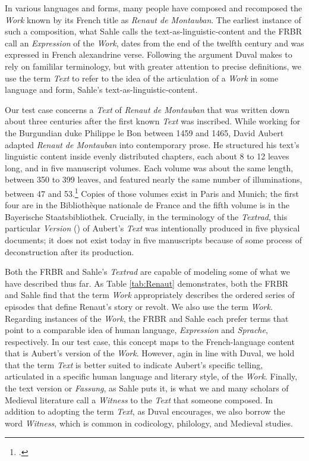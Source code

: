 In various languages and forms, many people have composed and recomposed the \textit{Work} known by its French title as \textit{Renaut de Montauban}. The earliest instance of such a composition, what Sahle calls the text-as-linguistic-content  and the FRBR call an \textit{Expression} of the \textit{Work}, dates from the end of the twelfth century and was expressed in French alexandrine verse. Following the argument Duval makes to rely on famililar terminology, but with greater attention to precise definitions, we use the term \textit{Text} to refer to the idea of the articulation of a \textit{Work} in some language and form, Sahle's text-as-linguistic-content.

Our test case concerns a \textit{Text} of \textit{Renaut de Montauban} that was written down about three centuries after the first known \textit{Text} was inscribed. While working for the Burgundian duke Philippe le Bon between 1459 and 1465, David Aubert adapted \textit{Renaut de Montauban} into contemporary prose. He structured his text's linguistic content inside evenly distributed chapters, each about 8 to 12 leaves long, and in five manuscript volumes. Each volume was about the same length, between 350 to 399 leaves, and featured nearly the same number of illuminations, between 47 and 53.\footcite[][]{Querel2007} Copies of those volumes exist in Paris and Munich; the first four are in the Bibliothèque nationale de France and the fifth volume is in the Bayerische Staatsbibliothek. Crucially, in the terminology of the \textit{Textrad}, this particular \textit{Version} () of Aubert's \textit{Text} was intentionally produced in five physical documents; it does not exist today in five manuscripts because of some process of deconstruction after its production.

Both the FRBR and Sahle's \textit{Textrad} are capable of modeling some of what we have described thus far. As Table \ref{tab:Renaut} demonstrates, both the FRBR and Sahle find that the term \textit{Work} appropriately describes the ordered series of episodes that define Renaut's story or revolt. We also use the term \textit{Work}. Regarding instances of the \textit{Work}, the FRBR and Sahle each prefer terms that point to a comparable idea of human language, \textit{Expression} and \textit{Sprache}, respectively. In our test case, this concept maps to the French-language content that is Aubert's version of the \textit{Work}. However, agin in line with Duval, we hold that the term \textit{Text} is better suited to indicate Aubert's specific telling, articulated in a specific human language and literary style, of the \textit{Work}. Finally, the text version or \textit{Fassung}, as Sahle puts it, is what we and many scholars of Medieval literature call a \textit{Witness} to the \textit{Text} that someone composed. In addition to adopting the term \textit{Text}, as Duval encourages, we also borrow the word \textit{Witness}, which is common in codicology, philology, and Medieval studies.

